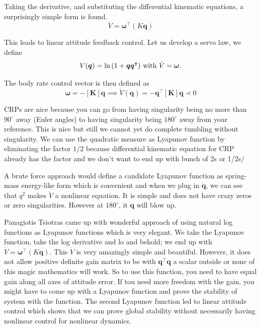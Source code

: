 \documentclass{article}
\begin{document}
Taking the derivative, and substituting the differential kinematic equations, a surprisingly simple form is found.
$$
\dot{V}=\bm{\omega}^{\intercal}(K\bm{q})
$$

This leads to linear attitude feedback control. Let us develop a servo law, we define
$$
V(\bm{q})=\ln{(1+\bm{q}\bm{q}^{\intercal})}\textnormal{ with }\dot{V}=\bm{\omega}.
$$

The body rate control vector is then defined as
$$
\bm{\omega}=-[\bm{K}]\bm{q}\implies\dot{V}(\bm{q})=-\bm{q}^{\intercal}[\bm{K}]\bm{q}\prec0
$$

CRPs are nice because you can go from having singularity being no more than $90^{\circ}$ away (Euler angles) to having singularity being $180^{\circ}$ away from your reference. This is nice but still we cannot yet do complete tumbling without singularity. We can use the quadratic measure as Lyapunov function by eliminating the factor $1/2$ because differential kinematic equation for CRP already has the factor and we don't want to end up with bunch of 2s or 1/2s/
 
A brute force approach would define a candidate Lyapunov function as spring-mass energy-like form which is convenient and when we plug in $\dot{\bm{q}}$, we can see that $q^{2}$ makes $\dot{V}$ a nonlinear equation. It is simple and does not have crazy zeros or zero singularities. However at $180^{\circ}$, it $\bm{q}$ will blow up.

Panagiotis Tsiotras came up with wonderful approach of using natural log functions as Lyapunov functions which is very elegant. We take the Lyapunov function, take the log derivative and lo and behold; we end up with $\dot{V}=\bm{\omega}^{\intercal}(K\bm{q})$. This $\dot{V}$ is very amazingly simple and beautiful. However, it does not allow positive definite gain matrix to be with $\bm{q}^{\intercal}\bm{q}$ a scalar outside or none of this magic mathematics will work. So to use this function, you need to have equal gain along all axes of attitude error. If tou need more freedom with the gain, you might have to come up with a Lyapunov function and prove the stability of system with the function. The second Lyapunov function led to linear attitude control which shows that we can prove global stability without necessarily having nonlinear control for nonlinear dynamics.
\end{document}
